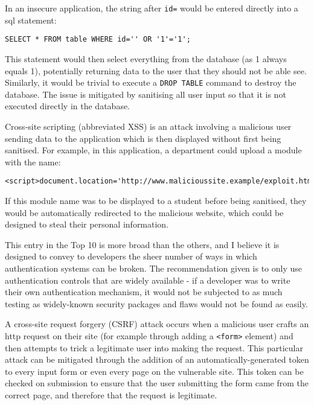 In an insecure application, the string after \texttt{id=} would be entered
directly into a \gls{sql} statement:

\begin{lstlisting}
SELECT * FROM table WHERE id='' OR '1'='1';
\end{lstlisting}

This statement would then select everything from the database (as 1 always
equals 1), potentially returning data to the user that they should not be able
see. Similarly, it would be trivial to execute a \texttt{DROP TABLE} command
to destroy the database. The issue is mitigated by sanitising all user input
so that it is not executed directly in the database.


Cross-site scripting (abbreviated XSS) is an attack involving a malicious user
sending data to the application which is then displayed without first being
sanitised. For example, in this application, a department could upload a
module with the name:

\begin{lstlisting}
<script>document.location='http://www.malicioussite.example/exploit.html'</script>
\end{lstlisting}

If this module name was to be displayed to a student before being sanitised,
they would be automatically redirected to the malicious website, which could
be designed to steal their personal information.


This entry in the Top 10 is more broad than the others, and I believe it is
designed to convey to developers the sheer number of ways in which
authentication systems can be broken. The recommendation given is to only use
authentication controls that are widely available - if a developer was to
write their own authentication mechanism, it would not be subjected to as much
testing as widely-known security packages and flaws would not be found as
easily.


A cross-site request forgery (CSRF) attack occurs when a malicious user crafts
an \gls{http} request on their site (for example through adding a
\texttt{<form>} element) and then attempts to trick a legitimate user into
making the request. This particular attack can be mitigated through the
addition of an automatically-generated token to every input form or even every
page on the vulnerable site. This token can be checked on submission to ensure
that the user submitting the form came from the correct page, and therefore
that the request is legitimate.

